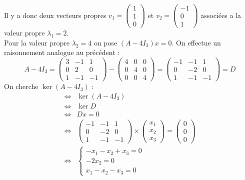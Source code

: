 \begin{ex}
Il y a donc deux vecteurs propres $v_1=\begin{pmatrix}1\\1\\0\end{pmatrix}$ et $v_2=\begin{pmatrix}-1\\0\\1\end{pmatrix}$ associées a la valeur propre $\lambda_1=2$.\\
\newline
Pour la valeur propre $\lambda_2=4$ on pose $(A-4I_3)x=0$.
On effectue un raisonnement analogue au précédent :
$$A-4 I_3=\begin{pmatrix}3&-1&1\\0&2&0\\1&-1&-1\end{pmatrix}-\begin{pmatrix}4&0&0\\0&4&0\\0&0&4\end{pmatrix}=\begin{pmatrix}-1&-1&1\\0&-2&0\\1&-1&-1\end{pmatrix}=D$$
On cherche $\ker(A-4I_3)$ :
\begin{align*}
    \Leftrightarrow & \ker(A-4I_3)\\
    \Leftrightarrow & \ker D\\
    \Leftrightarrow & Dx=0\\
    \Leftrightarrow & \begin{pmatrix}-1&-1&1\\0&-2&0\\1&-1&-1\end{pmatrix}\times\begin{pmatrix}x_1\\x_2\\x_3\end{pmatrix}=\begin{pmatrix}0\\0\\0\end{pmatrix}\\
    \Leftrightarrow & \begin{cases}-x_1-x_2+x_3=0\\-2x_2=0\\x_1-x_2-x_3=0\end{cases}\\

\end{align*}
\end{ex}
